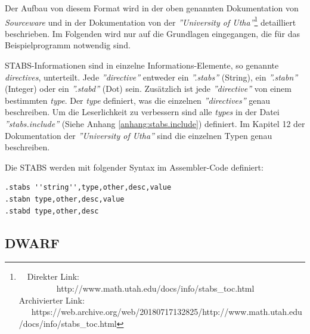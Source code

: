 Der Aufbau von diesem Format wird in der oben genannten Dokumentation von \textit{Sourceware} und in der Dokumentation von der \textit{''University of Utha''}\footnote{\ \ Direkter Link: \ \ \ \ \ \ \ \ \ http://www.math.utah.edu/docs/info/stabs\_toc.html\\ Archivierter Link: \ \ \ https://web.archive.org/web/20180717132825/http://www.math.utah.edu/docs/info/stabs\_toc.html} detailliert beschrieben.
Im Folgenden wird nur auf die Grundlagen eingegangen, die für das Beispielprogramm notwendig sind.

STABS-Informationen sind in einzelne Informations-Elemente, so genannte \textit{directives}, unterteilt.
Jede \textit{''directive''} entweder ein \textit{''.stabs''} (String), ein \textit{''.stabn''} (Integer) oder ein \textit{''.stabd''} (Dot) sein.
Zusätzlich ist jede \textit{''directive''} von einem bestimmten \textit{type}.
Der \textit{type} definiert, was die einzelnen \textit{''directives''} genau beschreiben.
Um die Leserlichkeit zu verbessern sind alle \textit{types} in der Datei \textit{''stabs.include''} (Siehe Anhang \ref{anhang:stabs.include}) definiert.
Im Kapitel 12 der Dokumentation der \textit{''University of Utha''} sind die einzelnen Typen genau beschreiben.

Die STABS werden mit folgender Syntax im Assembler-Code definiert:\\
\lstset{language=plain}
\begin{lstlisting}
.stabs ''string'',type,other,desc,value
.stabn type,other,desc,value
.stabd type,other,desc
\end{lstlisting}



\subsection{DWARF}



